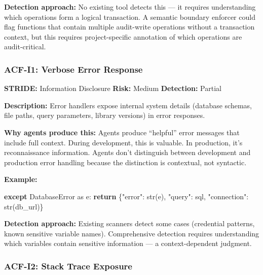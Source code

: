 \documentclass[a4paper,11pt]{report}
\newenvironment{Shaded}{\begin{snugshade}}{\end{snugshade}}
\newcommand{\BuiltInTok}[1]{#1}
\newcommand{\ControlFlowTok}[1]{\textcolor[rgb]{0.13,0.29,0.53}{\textbf{#1}}}
\newcommand{\ImportTok}[1]{#1}
\newcommand{\NormalTok}[1]{#1}
\newcommand{\StringTok}[1]{\textcolor[rgb]{0.31,0.60,0.02}{#1}}
\begin{document}
\textbf{Detection approach:} No existing tool detects this --- it
requires understanding which operations form a logical transaction. A
semantic boundary enforcer could flag functions that contain multiple
audit-write operations without a transaction context, but this requires
project-specific annotation of which operations are audit-critical.

\hypertarget{acf-i1-verbose-error-response}{%
\subsubsection{ACF-I1: Verbose Error
Response}\label{acf-i1-verbose-error-response}}

\textbf{STRIDE:} Information Disclosure \textbar{} \textbf{Risk:} Medium
\textbar{} \textbf{Detection:} Partial

\textbf{Description:} Error handlers expose internal system details
(database schemas, file paths, query parameters, library versions) in
error responses.

\textbf{Why agents produce this:} Agents produce ``helpful'' error
messages that include full context. During development, this is
valuable. In production, it's reconnaissance information. Agents don't
distinguish between development and production error handling because
the distinction is contextual, not syntactic.

\textbf{Example:}

\begin{Shaded}
\begin{Highlighting}[]
\ControlFlowTok{except}\NormalTok{ DatabaseError }\ImportTok{as}\NormalTok{ e:}
    \ControlFlowTok{return}\NormalTok{ \{}\StringTok{"error"}\NormalTok{: }\BuiltInTok{str}\NormalTok{(e), }\StringTok{"query"}\NormalTok{: sql, }\StringTok{"connection"}\NormalTok{: }\BuiltInTok{str}\NormalTok{(db\_url)\}}
\end{Highlighting}
\end{Shaded}

\textbf{Detection approach:} Existing scanners detect some cases
(credential patterns, known sensitive variable names). Comprehensive
detection requires understanding which variables contain sensitive
information --- a context-dependent judgment.

\hypertarget{acf-i2-stack-trace-exposure}{%
\subsubsection{ACF-I2: Stack Trace
Exposure}\label{acf-i2-stack-trace-exposure}}
\end{document}
